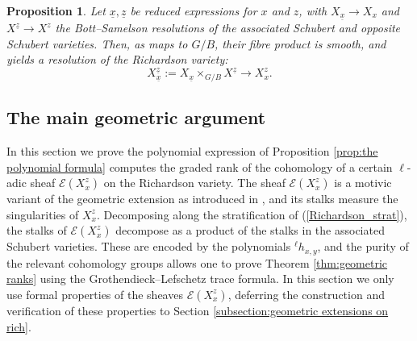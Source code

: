 \documentclass[11pt]{article}
\newtheorem{prop}[thm]{Proposition}
\theoremstyle{remark}
\theoremstyle{definition}
\begin{document}
\begin{prop}\label{Prop:res of richardsons}
    Let $\underline{x},\underline{z}$ be reduced expressions for $x$ and $z$, with $X_{\underline{x}}\to X_x$ and $X^{\underline{z}}\to X^z$ the Bott--Samelson resolutions of the associated Schubert and opposite Schubert varieties. Then, as maps to $G/B$, their fibre product is smooth, and yields a resolution of the Richardson variety: \[X^{\underline{z}}_{\underline{x}}:=X_{\underline{x}}\times_{G/B} X^{\underline{z}}\to X^z_x.
    \]
\end{prop}



\subsection{The main geometric argument}
\label{Subsec: geometric argument}
In this section we prove the polynomial expression of Proposition \ref{prop:the polynomial formula} computes the graded rank of the cohomology of a certain $\ell$-adic sheaf $\mathscr{E}({X}^z_x)$ on the Richardson variety. 
The sheaf $\mathscr{E}({X}^z_x)$ is a motivic variant of the geometric extension as introduced in \cite{HW23,McN18}, and its stalks measure the singularities of ${X}^z_x$.
Decomposing along the stratification of (\ref{Richardson_strat}), the stalks of $\mathscr{E}({X}^z_x)$ decompose as a product of the stalks in the associated Schubert varieties. 
These are encoded by the polynomials ${}^\ell {h}_{x,y}$, and the purity of the relevant cohomology groups allows one to prove Theorem \ref{thm:geometric ranks} using the Grothendieck--Lefschetz trace formula. In this section we only use formal properties of the sheaves $\mathscr{E}({X}^z_x)$, deferring the construction and verification of these properties to Section \ref{subsection:geometric extensions on rich}.
\\
\par
\end{document}
